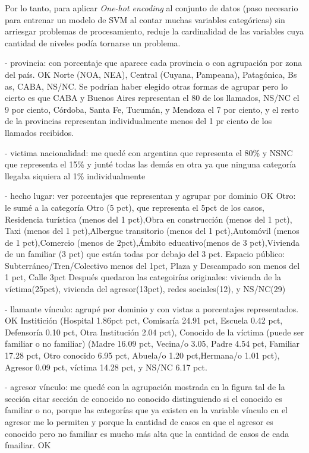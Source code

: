 \documentclass[10 pt]{article}
\begin{document}
Por lo tanto, para aplicar \textit{One-hot encoding} al conjunto de datos (paso necesario para entrenar un modelo de SVM al contar muchas variables categóricas) sin arriesgar problemas de procesamiento, reduje la cardinalidad de las variables cuya cantidad de niveles podía tornarse un problema.

- provincia: con porcentaje que aparece cada provincia o con agrupación por zona del país. OK
Norte (NOA, NEA), Central (Cuyana, Pampeana), Patagónica, Bs as, CABA, NS/NC. Se podrían haber elegido otras formas de agrupar pero lo cierto es que CABA y Buenos Aires representan el 80 de los llamados, NS/NC el 9 por ciento, Córdoba, Santa Fe, Tucumán, y Mendoza el 7 por ciento, y el resto de la provincias representan individualmente menos del 1 pr ciento de los llamados recibidos.

- victima nacionalidad: me quedé con argentina que representa el 80\% y NSNC que representa el 15\% y junté todas las demás en otra ya que ninguna categoría llegaba siquiera al 1\% individualmente

- hecho lugar: ver porcentajes que representan y agrupar por dominio OK
Otro: le sumé a la categoría Otro (5 pct), que representa el 5pct de los casos,  Residencia turística (menos del 1 pct),Obra en construcción (menos del 1 pct), Taxi (menos del 1 pct),Albergue transitorio (menos del 1 pct),Automóvil (menos de 1 pct),Comercio (menos de 2pct),Ámbito educativo(menos de 3 pct),Vivienda de un familiar (3 pct) que están todas por debajo del 3 pct.
Espacio público: Subterráneo/Tren/Colectivo menos del 1pct, Plaza y Descampado son menos del 1 pct, Calle 3pct
Después quedaron las categoirías originales: vivienda de la víctima(25pct), vivienda del agresor(13pct), redes sociales(12), y NS/NC(29)


- llamante vínculo: agrupé por dominio y con vistas a porcentajes representados. OK
 Institición (Hospital 1.86pct pct, Comisaría 24.91 pct, Escuela 0.42 pct, Defensoría 0.10 pct, Otra Institución 2.04 pct), Conocido de la víctima (puede ser familiar o no familiar) (Madre 16.09 pct, Vecina/o 3.05, Padre 4.54 pct, Familiar 17.28 pct, Otro conocido 6.95 pct, Abuela/o 1.20 pct,Hermana/o 1.01 pct), Agresor 0.09 pct, víctima 14.28 pct, y NS/NC 6.17 pct.

- agresor vínculo: me quedé con la agrupación mostrada en la figura tal de la sección citar sección  de conocido no conocido  distinguiendo si el conocido es familiar o no, porque las categorías que ya existen en la variable vínculo cn el agresor me lo permiten y porque la cantidad de casos en que el agresor es conocido pero no familiar es mucho más alta que la cantidad de casos de cada fmailiar. OK
\end{document}
